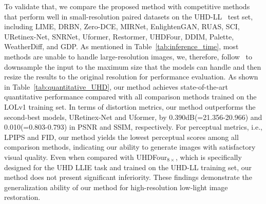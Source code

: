To validate that, we compare the proposed method with competitive methods that perform well in small-resolution paired datasets on the UHD-LL~\cite{UHD_ICLR} test set, including LIME, DRBN, Zero-DCE, MIRNet, EnlightenGAN, RUAS, SCI, URetinex-Net, SNRNet, Uformer, Restormer, UHDFour, DDIM, Palette, WeatherDiff, and GDP. As mentioned in Table~\ref{tab:inference_time}, most methods are unable to handle large-resolution images, we, therefore, follow~\cite{UHD_ICLR} to downsample the input to the maximum size that the models can handle and then resize the results to the original resolution for performance evaluation. As shown in Table~\ref{tab:quantitative_UHD}, our method achieves state-of-the-art quantitative performance compared with all comparison methods trained on the LOLv1 training set. In terms of distortion metrics, our method outperforms the second-best models, URetinex-Net and Uformer, by 0.390dB(=21.356-20.966) and 0.010(=0.803-0.793) in PSNR and SSIM, respectively. For perceptual metrics, i.e., LPIPS and FID, our method yields the lowest perceptual scores among all comparison methods, indicating our ability to generate images with satisfactory visual quality. Even when compared with UHDFour$_{8\times}$, which is specifically designed for the UHD LLIE task and trained on the UHD-LL training set, our method does not present significant inferiority. These findings demonstrate the generalization ability of our method for high-resolution low-light image restoration.
